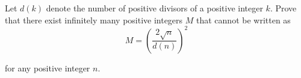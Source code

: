 Let $d(k)$ denote the number of positive divisors of a positive integer $k$. Prove that there exist infinitely many positive integers $M$ that cannot be written as\[M=\left(\frac{2\sqrt{n}}{d(n)}\right)^2\]

for any positive integer $n$.